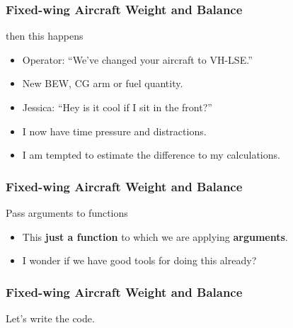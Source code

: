 \begin{frame}
\frametitle{Fixed-wing Aircraft Weight and Balance}
\begin{block}{then this happens}
\begin{itemize}
\item<1-> Operator: ``We've changed your aircraft to VH-LSE.''
\item<2-> New BEW, CG arm or fuel quantity.
\item<3-> Jessica: ``Hey is it cool if I sit in the front?''
\item<4-> I now have time pressure and distractions.
\item<5-> I am tempted to estimate the difference to my calculations.
\end{itemize}
\end{block}
\end{frame}

\begin{frame}
\frametitle{Fixed-wing Aircraft Weight and Balance}
\begin{block}{Pass arguments to functions}
\begin{itemize}
\item<1-> This \textbf{just a function} to which we are applying \textbf{arguments}.
\item<2-> I wonder if we have good tools for doing this already?
\end{itemize}
\end{block}
\end{frame}

\begin{frame}
\frametitle{Fixed-wing Aircraft Weight and Balance}
\begin{center}
Let's write the code.
\end{center}
\end{frame}

